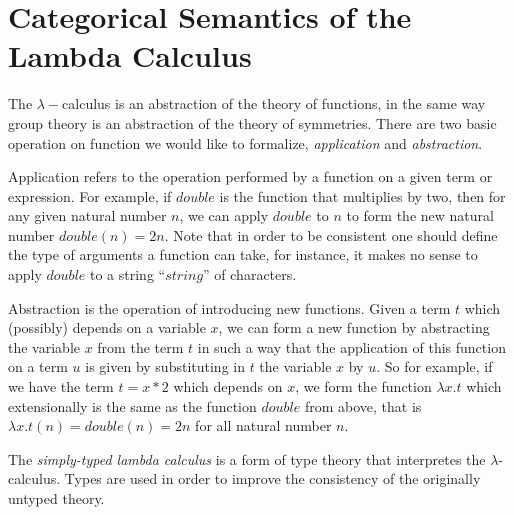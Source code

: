 %

\section{Categorical Semantics of the Lambda Calculus}


The $\lambda-$calculus is an abstraction of the theory of functions,
in the same way group theory is an abstraction of the theory of
symmetries. There are two basic operation on function we would like to
formalize, \emph{application} and \emph{abstraction}.

Application refers to the operation performed by a function on a given
term or expression. For example, if $double$ is the function that
multiplies by two, then for any given natural number $n$, we can apply
$double$ to $n$ to form the new natural number $double(n) = 2n$. Note
that in order to be consistent one should define the type of
arguments a function can take, for instance, it makes no sense to
apply $double$ to a string ``$string$'' of characters. 

Abstraction is the operation of introducing new functions. Given a
term $t$ which (possibly) depends on a variable $x$, we can form a
new function by abstracting the variable $x$ from the term $t$ in such a
way that the application of this function on a term $u$ is given by
substituting in $t$ the variable $x$ by $u$. So for example, if we
have the term $t = x * 2$ which depends on $x$, we form the function
$\lambda x.t$ which extensionally is the same as the function $double$
from above, that is $\lambda x.t(n) = double(n) = 2n$ for all natural
number $n$.

The \emph{simply-typed lambda calculus} is a form of type theory that
interpretes the $\lambda$-calculus. Types are used in order to improve
the consistency of the originally untyped theory.


